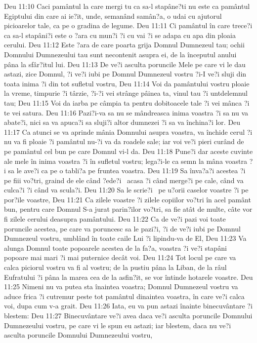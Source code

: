Deu 11:10  Caci pamântul la care mergi tu ca sa-l stapâne?ti nu este ca pamântul Egiptului din care ai ie?it, unde, semanând samân?a, o udai cu ajutorul picioarelor tale, ca pe o gradina de legume.
Deu 11:11  Ci pamântul în care trece?i ca sa-l stapâni?i este o ?ara cu mun?i ?i cu vai ?i se adapa cu apa din ploaia cerului.
Deu 11:12  Este ?ara de care poarta grija Domnul Dumnezeul tau; ochii Domnului Dumnezeului tau sunt necontenit asupra ei, de la începutul anului pâna la sfâr?itul lui.
Deu 11:13  De ve?i asculta poruncile Mele pe care vi le dau astazi, zice Domnul, ?i ve?i iubi pe Domnul Dumnezeul vostru ?i-I ve?i sluji din toata inima ?i din tot sufletul vostru,
Deu 11:14  Voi da pamântului vostru ploaie la vreme, timpurie ?i târzie, ?i-?i vei strânge pâinea ta, vinul tau ?i untdelemnul tau;
Deu 11:15  Voi da iarba pe câmpia ta pentru dobitoacele tale ?i vei mânca ?i te vei satura.
Deu 11:16  Pazi?i-va sa nu se mândreasca inima voastra ?i sa nu va abate?i, nici sa va apuca?i sa sluji?i altor dumnezei ?i sa va închina?i lor.
Deu 11:17  Ca atunci se va aprinde mânia Domnului asupra voastra, va închide cerul ?i nu va fi ploaie ?i pamântul nu-?i va da roadele sale; iar voi ve?i pieri curând de pe pamântul cel bun pe care Domnul vi-l da.
Deu 11:18  Pune?i dar aceste cuvinte ale mele în inima voastra ?i în sufletul vostru; lega?i-le ca semn la mâna voastra ?i sa le ave?i ca pe o tabli?a pe fruntea voastra.
Deu 11:19  Sa înva?a?i acestea ?i pe fiii vo?tri, graind de ele când ?ede?i  acasa ?i când merge?i pe cale, când va culca?i ?i când va scula?i.
Deu 11:20  Sa le scrie?i  pe u?orii caselor voastre ?i pe por?ile voastre,
Deu 11:21  Ca zilele voastre ?i zilele copiilor vo?tri în acel pamânt bun, pentru care Domnul S-a jurat parin?ilor vo?tri, sa fie atât de multe, câte vor fi zilele cerului deasupra pamântului.
Deu 11:22  Ca de ve?i pazi voi toate poruncile acestea, pe care va poruncesc sa le pazi?i, ?i de ve?i iubi pe Domnul Dumnezeul vostru, umblând în toate caile Lui ?i lipindu-va de El,
Deu 11:23  Va alunga Domnul toate popoarele acestea de la fa?a, voastra ?i ve?i stapâni popoare mai mari ?i mai puternice decât voi.
Deu 11:24  Tot locul pe care va calca piciorul vostru va fi al vostru; de la pustiu pâna la Liban, de la râul Eufratului ?i pâna la marea cea de la asfin?it, se vor întinde hotarele voastre.
Deu 11:25  Nimeni nu va putea sta înaintea voastra; Domnul Dumnezeul vostru va aduce frica ?i cutremur peste tot pamântul dinaintea voastra, în care ve?i calca voi, dupa cum v-a grait.
Deu 11:26  Iata, eu va pun astazi înainte binecuvântare ?i blestem:
Deu 11:27  Binecuvântare ve?i avea daca ve?i asculta poruncile Domnului Dumnezeului vostru, pe care vi le spun eu astazi; iar blestem, daca nu ve?i asculta poruncile Domnului Dumnezeului vostru,
